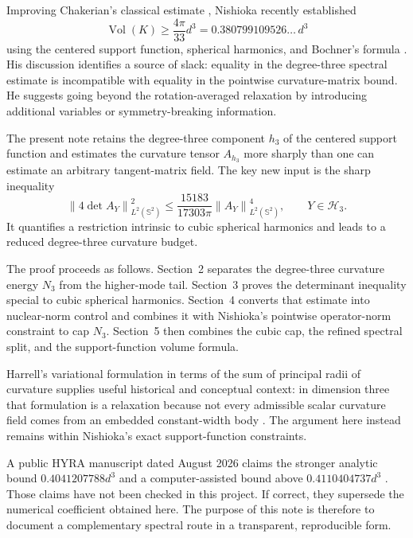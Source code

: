 \documentclass[11pt,reqno]{amsart}
\theoremstyle{remark}
\newcommand{\Sph}{\mathbb S^2}
\newcommand{\Harm}{\mathcal H}
\newcommand{\Vol}{\operatorname{Vol}}
\newcommand{\norm}[1]{\left\lVert #1\right\rVert}
\begin{document}
Improving Chakerian's classical estimate \cite{Chakerian1966}, Nishioka recently established
\[
 \Vol(K)\ge \frac{4\pi}{33}d^3
 =0.380799109526\ldots\,d^3
\]
using the centered support function, spherical harmonics, and Bochner's formula
\cite{Nishioka2027}. His discussion identifies a source of slack: equality in
the degree-three spectral estimate is incompatible with equality in the
pointwise curvature-matrix bound. He suggests going beyond the rotation-averaged
relaxation by introducing additional variables or symmetry-breaking information.

The present note retains the degree-three component $h_3$ of the centered
support function and estimates the curvature tensor $A_{h_3}$ more sharply than
one can estimate an arbitrary tangent-matrix field. The key new input is the
sharp inequality
\begin{equation}\label{eq:key-det-intro}
 \norm{4\det A_Y}_{L^2(\Sph)}^2
 \le \frac{15183}{17303\pi}\norm{A_Y}_{L^2(\Sph)}^4,
 \qquad Y\in\Harm_3.
\end{equation}
It quantifies a restriction intrinsic to cubic spherical harmonics and leads to
a reduced degree-three curvature budget.

The proof proceeds as follows. Section~2 separates the degree-three curvature
energy $N_3$ from the higher-mode tail. Section~3 proves the determinant
inequality special to cubic spherical harmonics. Section~4 converts that
estimate into nuclear-norm control and combines it with Nishioka's pointwise
operator-norm constraint to cap $N_3$. Section~5 then combines the cubic cap,
the refined spectral split, and the support-function volume formula.

Harrell's variational formulation in terms of the sum of principal radii of
curvature supplies useful historical and conceptual context: in dimension three
that formulation is a relaxation because not every admissible scalar curvature
field comes from an embedded constant-width body \cite{Harrell2002,Nishioka2027}.
The argument here instead remains within Nishioka's exact support-function
constraints.

A public HYRA manuscript dated August 2026 claims the stronger analytic bound
$0.4041207788d^3$ and a computer-assisted bound above $0.4110404737d^3$
\cite{HYRA2026}. Those claims have not been checked in this project. If correct,
they supersede the numerical coefficient obtained here. The purpose of this
note is therefore to document a complementary spectral route in a transparent,
reproducible form.
\end{document}
